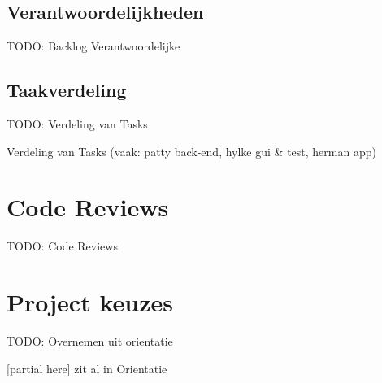 \subsection{Verantwoordelijkheden}

{\par \bigskip \par \color{red} TODO: Backlog Verantwoordelijke \par \bigskip \par }

\subsection{Taakverdeling}

{\par \bigskip \par \color{red} TODO: Verdeling van Tasks \par \bigskip \par }

Verdeling van Tasks (vaak: patty back-end, hylke gui \& test, herman app)

\section{Code Reviews}

{\par \bigskip \par \color{red} TODO: Code Reviews \par \bigskip \par }

\section{Project keuzes}

{\par \bigskip \par \color{red} TODO: Overnemen uit orientatie \par \bigskip \par }

[partial here] zit al in Orientatie


